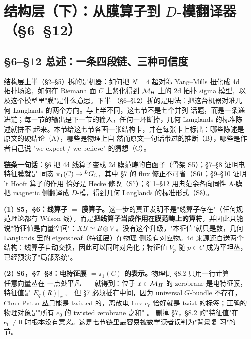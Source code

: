 

\section{结构层（下）：从膜算子到 $D$-模翻译器（\S6--\S12）}

\subsection{\S6--\S12 总述：一条四段链、三种可信度}

结构层上半（\S2--\S5）拆的是机器：如何把 $N=4$ 超对称 Yang--Mills 扭化成 4d 拓扑场论，如何在
Riemann 面 $C$ 上紧化得到 $\mathcal{M}_H$ 上的 2d 拓扑 sigma 模型，以及这个模型里"膜"是什么意思。下半
（\S6--\S12）拆的是用法：把这台机器对准几何 Langlands 的两个方向。与上半不同，这七节不是七个并列
话题，而是一条递进链；每一节的输出是下一节的输入，任何一环断掉，几何 Langlands 的标准陈述就拼不
起来。本节给这七节各画一张结构卡，并在每张卡上标出：哪些陈述是原文的硬结论（A），哪些是物理上自
然而原文一句话带过的推断（B），哪些是作者自己说 "we expect / we believe" 的猜想（C）。

\begin{keyidea}
\textbf{链条一句话}：\S6 把 4d 线算子变成 2d 膜范畴的自函子（骨架 S5）；\S7--\S8 证明电特征膜就是
同态 $\pi_1(C)\to{}^{L}G_{\mathbb{C}}$，其中 \S7 的 flux 修正不可省（S6）；\S9--\S10 证明 't Hooft 算子的作用
恰好是 Hecke 修改（S7）；\S11--\S12 用典范余各向同性 A-膜把 magnetic 侧翻译成 $D$-模，得到几何
Langlands 的标准形式（S8）。
\end{keyidea}

\textbf{(1) S5，\S6：线算子 $=$ 膜算子。}这一步的真正发明不是"线算子存在"（任何规范理论都有 Wilson
线），而是\textbf{把线算子当成作用在膜范畴上的算符}，并因此只能说"特征值是向量空间"：$XB\simeq B\otimes V$
\pA{}。没有这个升级，"本征值"就只是数，几何 Langlands 里的 eigensheaf（特征层）在物理
侧没有对应物。4d 来源还白送两个结构：线算子自动交换，因此可以同时对角化；特征值 $V_p$ 随 $p\in C$
成为平坦丛，已经预演了"局部系统"。

\textbf{(2) S6，\S7--\S8：电特征膜 $=\pi_1(C)$ 的表示。}物理侧 \S8.2 只用一行计算——任意向量丛在
一点处平凡——就得到：位于 $x\in\mathcal{M}_H$ 的 zerobrane 是电特征膜，特征值是 $E_q(R)|_x$ \pA{}。
但 \S7 必须插在中间，因为 universal $G$-bundle 不存在，Chan-Paton 丛只能是 twisted 的，离散电
flux $e_0$ 恰好就是 twist 的标签；正确的物理对象是"所有 $e_0$ 的 twisted zerobrane 之和" \pA{}。
删掉 \S7，\S8.2 的"特征值"在 $e_0\ne0$ 时根本没有意义。这是七节链里最容易被数学读者误判为"背景复
习"的一节。

